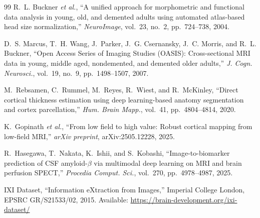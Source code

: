 \begin{thebibliography}{99}
R.~L. Buckner \textit{et al.},
``A unified approach for morphometric and functional data analysis in young, old, and demented adults using automated atlas-based head size normalization,''
\textit{NeuroImage}, vol.~23, no.~2, pp.~724--738, 2004.

D.~S. Marcus, T.~H. Wang, J.~Parker, J.~G. Csernansky, J.~C. Morris, and R.~L. Buckner,
``Open Access Series of Imaging Studies (OASIS): Cross-sectional MRI data in young, middle aged, nondemented, and demented older adults,''
\textit{J. Cogn. Neurosci.}, vol.~19, no.~9, pp.~1498--1507, 2007.

M.~Rebsamen, C.~Rummel, M.~Reyes, R.~Wiest, and R.~McKinley,
``Direct cortical thickness estimation using deep learning-based anatomy segmentation and cortex parcellation,''
\textit{Hum. Brain Mapp.}, vol.~41, pp.~4804--4814, 2020.

K.~Gopinath \textit{et al.},
``From low field to high value: Robust cortical mapping from low-field MRI,''
\textit{arXiv preprint}, arXiv:2505.12228, 2025.

R.~Hasegawa, T.~Nakata, K.~Ishii, and S.~Kobashi,
``Image-to-biomarker prediction of CSF amyloid-$\beta$ via multimodal deep learning on MRI and brain perfusion SPECT,''
\textit{Procedia Comput. Sci.}, vol.~270, pp.~4978--4987, 2025.

IXI Dataset,
``Information eXtraction from Images,''
Imperial College London, EPSRC GR/S21533/02, 2015.
Available: \url{https://brain-development.org/ixi-dataset/}

\end{thebibliography}
